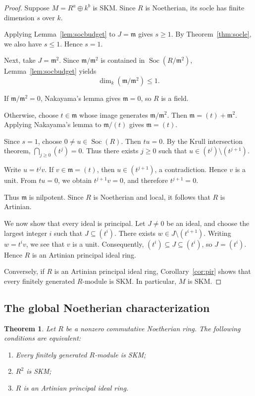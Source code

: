\documentclass[11pt,a4paper]{article}
\newtheorem{theorem}{Theorem}[section]
\theoremstyle{definition}
\theoremstyle{remark}
\begin{document}
\begin{proof}
Suppose $M=R^a\oplus k^b$ is SKM. Since $R$ is Noetherian, its socle has finite dimension $s$ over $k$.

Applying Lemma~\ref{lem:socbudget} to $J=\mathfrak m$ gives $s\geq1$. By Theorem~\ref{thm:socle}, we also have $s\leq1$. Hence $s=1$.

Next, take $J=\mathfrak m^2$. Since $\mathfrak m/\mathfrak m^2$ is contained in $\operatorname{Soc}(R/\mathfrak m^2)$, Lemma~\ref{lem:socbudget} yields
\[
\dim_k(\mathfrak m/\mathfrak m^2)\leq1.
\]

If $\mathfrak m/\mathfrak m^2=0$, Nakayama's lemma gives $\mathfrak m=0$, so $R$ is a field.

Otherwise, choose $t\in\mathfrak m$ whose image generates $\mathfrak m/\mathfrak m^2$. Then $\mathfrak m=(t)+\mathfrak m^2$. Applying Nakayama's lemma to $\mathfrak m/(t)$ gives $\mathfrak m=(t)$.

Since $s=1$, choose $0\ne u\in\operatorname{Soc}(R)$. Then $tu=0$. By the Krull intersection theorem,
$\bigcap_{j\geq0}(t^j)=0$.
Thus there exists $j\geq0$ such that $u\in(t^j)\setminus(t^{j+1})$.

Write $u=t^jv$. If $v\in\mathfrak m=(t)$, then $u\in(t^{j+1})$, a contradiction. Hence $v$ is a unit. From $tu=0$, we obtain $t^{j+1}v=0$, and therefore $t^{j+1}=0$.

Thus $\mathfrak m$ is nilpotent. Since $R$ is Noetherian and local, it follows that $R$ is Artinian.

We now show that every ideal is principal. Let $J\ne0$ be an ideal, and choose the largest integer $i$ such that $J\subseteq(t^i)$. There exists $w\in J\setminus(t^{i+1})$. Writing $w=t^iv$, we see that $v$ is a unit. Consequently, $(t^i)\subseteq J\subseteq(t^i)$, so $J=(t^i)$. Hence $R$ is an Artinian principal ideal ring.

Conversely, if $R$ is an Artinian principal ideal ring, Corollary~\ref{cor:pir} shows that every finitely generated $R$-module is SKM. In particular, $M$ is SKM.
\end{proof}



\subsection{The global Noetherian characterization}

\begin{theorem}
\label{thm:noethglobal}
Let $R$ be a nonzero commutative Noetherian ring. The following conditions are equivalent:
\begin{enumerate}[label=\textup{(\roman*)}]
\item Every finitely generated $R$-module is SKM;
\item $R^2$ is SKM;
\item $R$ is an Artinian principal ideal ring.
\end{enumerate}
\end{theorem}
\end{document}
